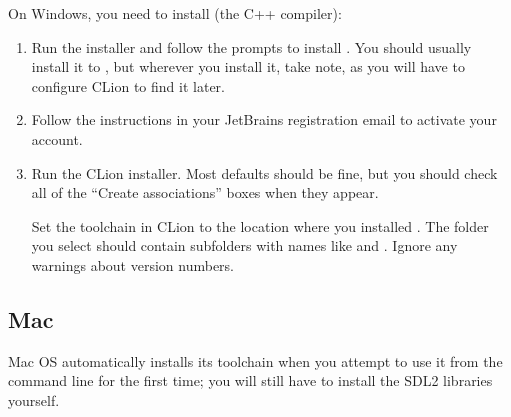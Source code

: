\documentclass{tufte-handout}
\begin{document}
On Windows, you need to install  (the C++ compiler):

\begin{enumerate}

  \item Run the  installer and follow the
    prompts to install . You should usually install it to
    , but wherever you install it, take
    note, as you will have to configure CLion to find it later.

  \item Follow the instructions in your JetBrains registration email to
    activate your account.

\item Run the CLion installer. Most defaults should be fine, but you
  should check all of the ``Create associations'' boxes when they
    appear.

   Set the toolchain in CLion to the location where you installed
    . The folder you select should contain subfolders
    with names like  and . Ignore any
    warnings about version numbers.

\end{enumerate}

\subsection{Mac}

Mac OS automatically installs its toolchain when you attempt to use it
from the command line for the first time; you will still have to
install the SDL2 libraries yourself.
\end{document}
